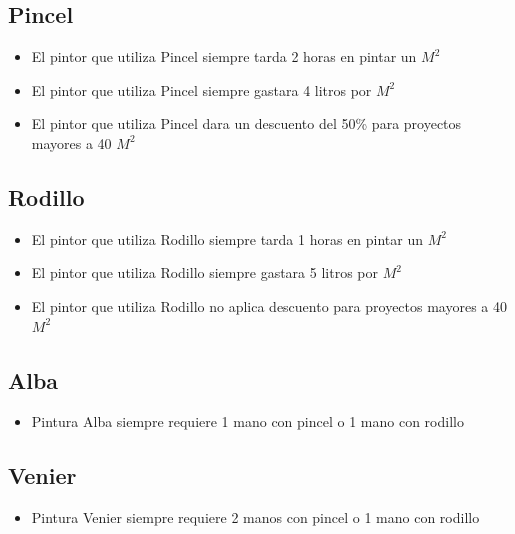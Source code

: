 \documentclass[titlepage,a4paper]{article}
\begin{document}
  \subsection{Pincel}
    \begin{itemize}
      \item El pintor que utiliza Pincel siempre tarda 2 horas en pintar un $M^2$
      \item El pintor que utiliza Pincel siempre gastara 4 litros por $M^2$
      \item El pintor que utiliza Pincel dara un descuento del 50\% para proyectos mayores a 40 $M^2$
    \end{itemize}

  \subsection{Rodillo}
    \begin{itemize}
      \item El pintor que utiliza Rodillo siempre tarda 1 horas en pintar un $M^2$
      \item El pintor que utiliza Rodillo siempre gastara 5 litros por $M^2$
      \item El pintor que utiliza Rodillo no aplica descuento para proyectos mayores a 40 $M^2$
    \end{itemize}

  \subsection{Alba}
    \begin{itemize}
      \item Pintura Alba siempre requiere 1 mano con pincel o 1 mano con rodillo
    \end{itemize}

  \subsection{Venier}
    \begin{itemize}
      \item Pintura Venier siempre requiere 2 manos con pincel o 1 mano con rodillo
    \end{itemize}
  

\newpage
\end{document}
